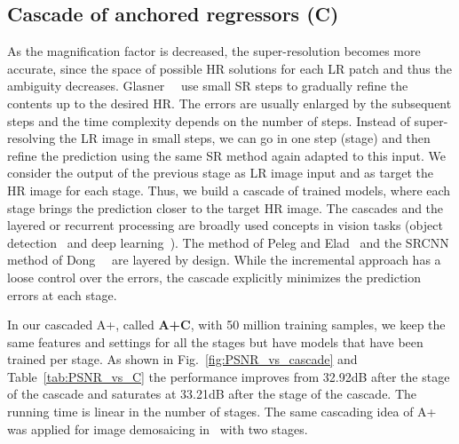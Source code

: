 \documentclass[10pt,twocolumn,letterpaper]{article}
\begin{document}
\subsection{Cascade of anchored regressors (C)}
\label{ssc:cascade}
As the magnification factor is decreased, the super-resolution becomes more accurate, since the space of possible HR solutions for each LR patch and thus the ambiguity decreases.
Glasner~\etal~\cite{Glasner-ICCV-2009} use small SR steps to gradually refine the contents up to the desired HR. The errors are usually enlarged by the subsequent steps and the time complexity depends on the number of steps.
Instead of super-resolving the LR image in small steps, we can go in one step (stage) and then refine the prediction using the same SR method again adapted to this input. We consider the output of the previous stage as LR image input and as target the HR image for each stage.
Thus, we build a cascade of trained models, where each stage brings the prediction closer to the target HR image. The cascades and the layered or recurrent processing are broadly used concepts in vision tasks (\ie object detection~\cite{Viola-CVPR-2001} and deep learning~\cite{Chatfield-BMVC-2014}). The method of Peleg and Elad~\cite{Peleg-TIP-2014} and the SRCNN method of Dong~\etal~\cite{Dong-ECCV-2014} are layered by design.
While the incremental approach has a loose control over the errors, the cascade explicitly minimizes the prediction errors at each stage.

In our cascaded A+, called \textbf{A+C}, with 50 million training samples, we keep the same features and settings for all the stages but have models that have been trained per stage.
As shown in Fig.~\ref{fig:PSNR_vs_cascade} and Table~\ref{tab:PSNR_vs_C} the performance improves from 32.92dB after the  stage of the cascade and saturates at 33.21dB after the  stage of the cascade. The running time is linear in the number of stages.
The same cascading idea of A+ was applied for image demosaicing in~\cite{Wu-ICIP-2015} with two stages.
\end{document}

